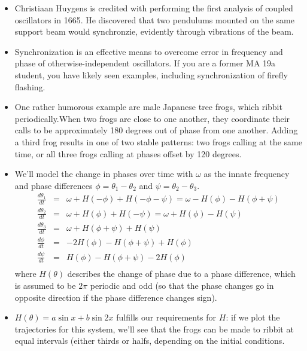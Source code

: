 \documentclass{article}
\begin{document}
\begin{itemize}
\item Christiaan Huygens is credited with performing the first analysis of coupled oscillators in 1665. He discovered that two pendulums mounted on the same support beam would synchronzie, evidently through vibrations of the beam.
\item Synchronization is an effective means to overcome error in frequency and phase of otherwise-independent oscillators. If you are a former MA 19a student, you have likely seen examples, including synchronization of firefly flashing.
\item One rather humorous example are male Japanese tree frogs, which ribbit periodically.When two frogs are close to one another, they coordinate their calls to be approximately 180 degrees out of phase from one another. Adding a third frog results in one of two stable patterns: two frogs calling at the same time, or all three frogs calling at phases offset by 120 degrees.
\item We'll model the change in phases over time with $\omega$ as the innate frequency and phase differences $\phi = \theta_1 - \theta_2$ and $\psi = \theta_2 - \theta_3$.
\begin{eqnarray*}
\frac{d\theta_1}{dt} & = & \omega + H(- \phi) + H(- \phi - \psi) = \omega - H(\phi) - H(\phi + \psi)\\
\frac{d\theta_2}{dt} & = & \omega + H(\phi) + H(-\psi) =  \omega + H(\phi) - H(\psi)\\
\frac{d\theta_3}{dt} & = & \omega + H(\phi + \psi) + H(\psi)\\
\frac{d\phi}{dt} & = & -2 H(\phi) - H(\phi + \psi) + H(\phi)\\
\frac{d\psi}{dt} & = & H(\phi) - H(\phi + \psi)  - 2 H(\phi)\\
\end{eqnarray*}
where $H(\theta)$ describes the change of phase due to a phase difference, which is assumed to be $2\pi$ periodic and odd (so that the phase changes go in opposite direction if the phase difference changes sign).

\item  $H(\theta)= a \sin x + b \sin 2x$ fulfills our requirements for $H$: if we plot the trajectories for this system, we'll see that the frogs can be made to ribbit at equal intervals (either thirds or halfs, depending on the initial conditions.
\end{itemize}
\end{document}
